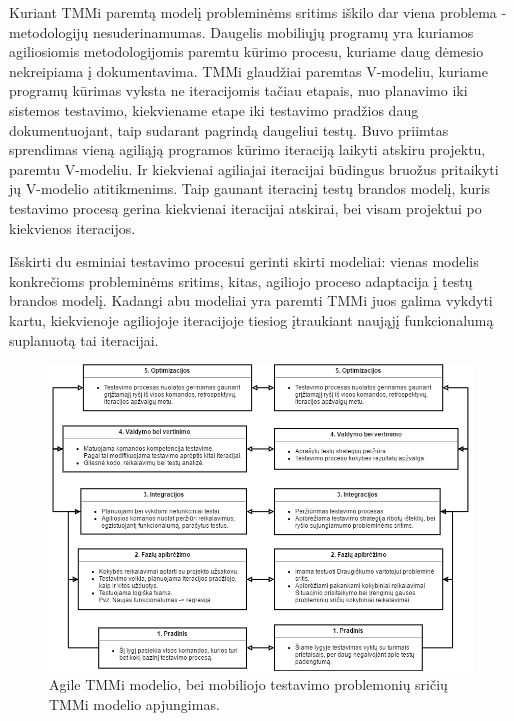 \documentclass{VUMIFPSkursinis}
\begin{document}
Kuriant TMMi paremtą modelį probleminėms sritims iškilo dar viena problema - metodologijų nesuderinamumas. Daugelis mobiliųjų programų yra kuriamos agiliosiomis metodologijomis paremtu kūrimo procesu, kuriame daug dėmesio nekreipiama į dokumentavima. TMMi glaudžiai paremtas V-modeliu, kuriame programų kūrimas vyksta ne iteracijomis tačiau etapais, nuo planavimo iki sistemos testavimo, kiekviename etape iki testavimo pradžios daug dokumentuojant, taip sudarant pagrindą daugeliui testų. Buvo priimtas sprendimas vieną agiliąją programos kūrimo iteraciją laikyti atskiru projektu, paremtu V-modeliu. Ir kiekvienai agiliajai iteracijai būdingus bruožus pritaikyti jų V-modelio atitikmenims. Taip gaunant iteracinį testų brandos modelį, kuris testavimo procesą gerina kiekvienai iteracijai atskirai, bei visam projektui po kiekvienos iteracijos.

Išskirti du esminiai testavimo procesui gerinti skirti modeliai: vienas modelis konkrečioms probleminėms sritims, kitas, agiliojo proceso adaptacija į testų brandos modelį. Kadangi abu modeliai yra paremti TMMi juos galima vykdyti kartu, kiekvienoje agiliojoje iteracijoje tiesiog įtraukiant naująjį funkcionalumą suplanuotą tai iteracijai.

\begin{figure}[H]
    \centering
    \includegraphics[scale=0.75, angle=90]{img/agilemobile}
    \caption{Agile TMMi modelio, bei mobiliojo testavimo problemonių sričių TMMi modelio apjungimas.}
    \label{img:agilemobile}
\end{figure}

\printbibliography[heading=bibintoc]  %
\end{document}
